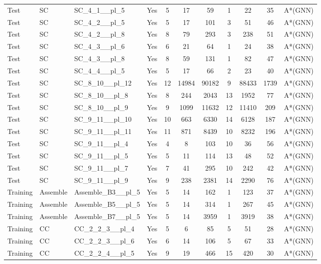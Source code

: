 \documentclass{article}
\begin{document}
\begin{tabular}{lllcccccccc}
Test & SC & SC\_4\_1\_\_pl\_5 & Yes & 5 & 17 & 59 & 1 & 22 & 35 & A*(GNN) \\
Test & SC & SC\_4\_2\_\_pl\_5 & Yes & 5 & 17 & 101 & 3 & 51 & 46 & A*(GNN) \\
Test & SC & SC\_4\_2\_\_pl\_8 & Yes & 8 & 79 & 293 & 3 & 238 & 51 & A*(GNN) \\
Test & SC & SC\_4\_3\_\_pl\_6 & Yes & 6 & 21 & 64 & 1 & 24 & 38 & A*(GNN) \\
Test & SC & SC\_4\_3\_\_pl\_8 & Yes & 8 & 59 & 131 & 1 & 82 & 47 & A*(GNN) \\
Test & SC & SC\_4\_4\_\_pl\_5 & Yes & 5 & 17 & 66 & 2 & 23 & 40 & A*(GNN) \\
Test & SC & SC\_8\_10\_\_pl\_12 & Yes & 12 & 14984 & 90182 & 9 & 88433 & 1739 & A*(GNN) \\
Test & SC & SC\_8\_10\_\_pl\_8 & Yes & 8 & 244 & 2043 & 13 & 1952 & 77 & A*(GNN) \\
Test & SC & SC\_8\_10\_\_pl\_9 & Yes & 9 & 1099 & 11632 & 12 & 11410 & 209 & A*(GNN) \\
Test & SC & SC\_9\_11\_\_pl\_10 & Yes & 10 & 663 & 6330 & 14 & 6128 & 187 & A*(GNN) \\
Test & SC & SC\_9\_11\_\_pl\_11 & Yes & 11 & 871 & 8439 & 10 & 8232 & 196 & A*(GNN) \\
Test & SC & SC\_9\_11\_\_pl\_4 & Yes & 4 & 8 & 103 & 10 & 36 & 56 & A*(GNN) \\
Test & SC & SC\_9\_11\_\_pl\_5 & Yes & 5 & 11 & 114 & 13 & 48 & 52 & A*(GNN) \\
Test & SC & SC\_9\_11\_\_pl\_7 & Yes & 7 & 41 & 295 & 10 & 242 & 42 & A*(GNN) \\
Test & SC & SC\_9\_11\_\_pl\_9 & Yes & 9 & 238 & 2381 & 14 & 2290 & 76 & A*(GNN) \\
Training & Assemble & Assemble\_B3\_\_pl\_5 & Yes & 5 & 14 & 162 & 1 & 123 & 37 & A*(GNN) \\
Training & Assemble & Assemble\_B5\_\_pl\_5 & Yes & 5 & 14 & 314 & 1 & 267 & 45 & A*(GNN) \\
Training & Assemble & Assemble\_B7\_\_pl\_5 & Yes & 5 & 14 & 3959 & 1 & 3919 & 38 & A*(GNN) \\
Training & CC & CC\_2\_2\_3\_\_pl\_4 & Yes & 5 & 6 & 85 & 5 & 51 & 28 & A*(GNN) \\
Training & CC & CC\_2\_2\_3\_\_pl\_6 & Yes & 6 & 14 & 106 & 5 & 67 & 33 & A*(GNN) \\
Training & CC & CC\_2\_2\_4\_\_pl\_5 & Yes & 9 & 19 & 466 & 15 & 420 & 30 & A*(GNN) \\

\end{tabular}
\end{document}
